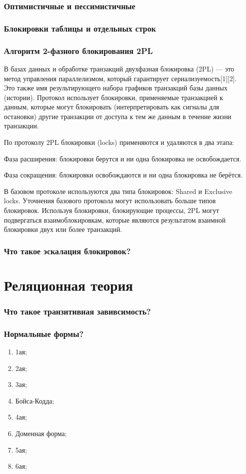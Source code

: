 \subsection{Оптимистичные и пессимистичные}
\subsection{Блокировки таблицы и отдельных строк}
\subsection{Алгоритм 2-фазного блокирования 2PL}

В базах данных и обработке транзакций двухфазная блокировка (2PL) — это метод управления параллелизмом, который гарантирует сериализуемость[1][2]. Это также имя результирующего набора графиков транзакций базы данных (истории). Протокол использует блокировки, применяемые транзакцией к данным, которые могут блокировать (интерпретировать как сигналы для остановки) другие транзакции от доступа к тем же данным в течение жизни транзакции.

По протоколу 2PL блокировки (locks) применяются и удаляются в два этапа:

Фаза расширения: блокировки берутся и ни одна блокировка не освобождается.

Фаза сокращения: блокировки освобождаются и ни одна блокировка не берётся.

В базовом протоколе используются два типа блокировок: Shared и Exclusive locks. Уточнения базового протокола могут использовать больше типов блокировок. Используя блокировки, блокирующие процессы, 2PL могут подвергаться взаимоблокировкам, которые являются результатом взаимной блокировки двух или более транзакций. 

\subsection{Что такое эскалация блокировок?}

\chapter{Реляционная теория}
\subsection{Что такое транзитивная завивсимость?}
\subsection{Нормальные формы?}
\begin{enumerate}
    \item 1ая;
    \item 2ая;
    \item 3ая;
    \item Бойса-Кодда;
    \item 4ая;
    \item Доменная форма;
    \item 5ая;
    \item 6ая;
\end{enumerate}
